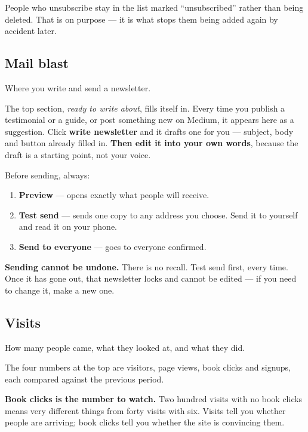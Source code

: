 \documentclass[11pt,a4paper]{article}
\newenvironment{callout}
  {\par\medskip\noindent\begin{list}{}{%
     \setlength{\leftmargin}{1.2em}\setlength{\rightmargin}{0pt}%
     \setlength{\labelwidth}{0pt}\setlength{\itemindent}{0pt}}%
   \item[]\color{ink}\hspace{-1.2em}%
   \makebox[0pt][l]{\raisebox{-0.35\baselineskip}[0pt][0pt]{%
     \textcolor{gold}{\rule{2pt}{1.15\baselineskip}}}}\hspace{1.2em}\ignorespaces}
  {\end{list}\medskip}
\newcommand{\lead}[1]{\textbf{\color{ink}#1}}
\begin{document}
People who unsubscribe stay in the list marked ``unsubscribed'' rather than
being deleted. That is on purpose --- it is what stops them being added again
by accident later.

\subsection{Mail blast}

Where you write and send a newsletter.

The top section, \emph{ready to write about}, fills itself in. Every time you
publish a testimonial or a guide, or post something new on Medium, it appears
here as a suggestion. Click \textbf{write newsletter} and it drafts one for you
--- subject, body and button already filled in. \textbf{Then edit it into your
own words}, because the draft is a starting point, not your voice.

Before sending, always:

\begin{enumerate}
  \item \lead{Preview} --- opens exactly what people will receive.
  \item \lead{Test send} --- sends one copy to any address you choose. Send it
        to yourself and read it on your phone.
  \item \lead{Send to everyone} --- goes to everyone confirmed.
\end{enumerate}

\begin{callout}
\lead{Sending cannot be undone.} There is no recall. Test send first, every
time. Once it has gone out, that newsletter locks and cannot be edited --- if
you need to change it, make a new one.
\end{callout}

\subsection{Visits}

How many people came, what they looked at, and what they did.

The four numbers at the top are visitors, page views, book clicks and signups,
each compared against the previous period.

\lead{Book clicks is the number to watch.} Two hundred visits with no book
clicks means very different things from forty visits with six. Visits tell you
whether people are arriving; book clicks tell you whether the site is
convincing them.
\end{document}
